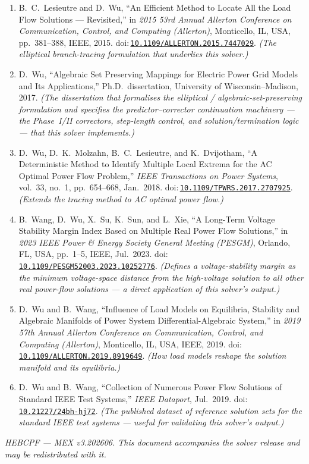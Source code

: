 \documentclass[11pt,a4paper]{article}
\newcommand{\doi}[1]{\href{https://doi.org/#1}{\nolinkurl{#1}}}
\begin{document}
\begin{enumerate}[leftmargin=1.6em]
\item B.\ C.\ Lesieutre and D.\ Wu, ``An Efficient Method to Locate All the Load Flow
      Solutions --- Revisited,'' in \emph{2015 53rd Annual Allerton Conference on
      Communication, Control, and Computing (Allerton)}, Monticello, IL, USA, pp.~381--388,
      IEEE, 2015. doi:\,\doi{10.1109/ALLERTON.2015.7447029}. \emph{(The elliptical
      branch-tracing formulation that underlies this solver.)}
\item D.\ Wu, ``Algebraic Set Preserving Mappings for Electric Power Grid Models and Its
      Applications,'' Ph.D.\ dissertation, University of Wisconsin--Madison, 2017.
      \emph{(The dissertation that formalises the elliptical / algebraic-set-preserving
      formulation and specifies the predictor--corrector continuation machinery --- the
      Phase~I/II correctors, step-length control, and solution/termination logic --- that
      this solver implements.)}
\item D.\ Wu, D.\ K.\ Molzahn, B.\ C.\ Lesieutre, and K.\ Dvijotham, ``A Deterministic
      Method to Identify Multiple Local Extrema for the AC Optimal Power Flow Problem,''
      \emph{IEEE Transactions on Power Systems}, vol.~33, no.~1, pp.~654--668, Jan.\ 2018.
      doi:\,\doi{10.1109/TPWRS.2017.2707925}.
      \emph{(Extends the tracing method to AC optimal power flow.)}
\item B.\ Wang, D.\ Wu, X.\ Su, K.\ Sun, and L.\ Xie, ``A Long-Term Voltage Stability
      Margin Index Based on Multiple Real Power Flow Solutions,'' in \emph{2023 IEEE Power
      \& Energy Society General Meeting (PESGM)}, Orlando, FL, USA, pp.~1--5, IEEE,
      Jul.\ 2023. doi:\,\doi{10.1109/PESGM52003.2023.10252776}.
      \emph{(Defines a voltage-stability margin as the
      minimum voltage-space distance from the high-voltage solution to all other real
      power-flow solutions --- a direct application of this solver's output.)}
\item D.\ Wu and B.\ Wang, ``Influence of Load Models on Equilibria, Stability and
      Algebraic Manifolds of Power System Differential-Algebraic System,'' in \emph{2019
      57th Annual Allerton Conference on Communication, Control, and Computing
      (Allerton)}, Monticello, IL, USA, IEEE, 2019.
      doi:\,\doi{10.1109/ALLERTON.2019.8919649}. \emph{(How load models reshape the
      solution manifold and its equilibria.)}
\item D.\ Wu and B.\ Wang, ``Collection of Numerous Power Flow Solutions of Standard IEEE
      Test Systems,'' \emph{IEEE Dataport}, Jul.\ 2019.
      doi:\,\doi{10.21227/24bh-hj72}. \emph{(The published dataset of reference solution
      sets for the standard IEEE test systems --- useful for validating this solver's
      output.)}
\end{enumerate}

\vfill
\begin{center}\small\itshape
HEBCPF --- MEX v3.202606. This document accompanies the solver release and may be
redistributed with it.
\end{center}
\end{document}
